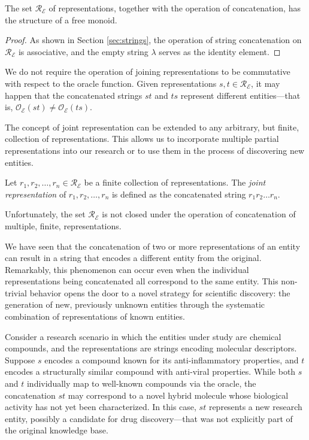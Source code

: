 \begin{proposition}
The set $\mathcal{R}_\mathcal{E}$ of representations, together with the operation of concatenation, has the structure of a free monoid.
\end{proposition}
\begin{proof}
As shown in Section \ref{sec:strings}, the operation of string concatenation on $\mathcal{R}_\mathcal{E}$ is associative, and the empty string $\lambda$ serves as the identity element.
\end{proof}

We do not require the operation of joining representations to be commutative with respect to the oracle function. Given representations $s, t \in \mathcal{R}_\mathcal{E}$, it may happen that the concatenated strings $st$ and $ts$ represent different entities—that is, $\mathcal{O}_\mathcal{E} \left( st \right) \neq \mathcal{O}_\mathcal{E} \left( ts \right)$.

The concept of joint representation can be extended to any arbitrary, but finite, collection of representations. This allows us to incorporate multiple partial representations into our research or to use them in the process of discovering new entities.

\begin{definition}
Let $r_1, r_2, \ldots, r_n \in \mathcal{R}_\mathcal{E}$ be a finite collection of representations. The \emph{joint representation} of $r_1, r_2, \ldots, r_n$ is defined as the concatenated string $r_1 r_2 \ldots r_n$.
\end{definition}

Unfortunately, the set $\mathcal{R}_\mathcal{E}$ is not closed under the operation of concatenation of multiple, finite, representations.

We have seen that the concatenation of two or more representations of an entity can result in a string that encodes a different entity from the original. Remarkably, this phenomenon can occur even when the individual representations being concatenated all correspond to the same entity. This non-trivial behavior opens the door to a novel strategy for scientific discovery: the generation of new, previously unknown entities through the systematic combination of representations of known entities.

\begin{example}
Consider a research scenario in which the entities under study are chemical compounds, and the representations are strings encoding molecular descriptors. Suppose $s$ encodes a compound known for its anti-inflammatory properties, and $t$ encodes a structurally similar compound with anti-viral properties. While both $s$ and $t$ individually map to well-known compounds via the oracle, the concatenation $st$ may correspond to a novel hybrid molecule whose biological activity has not yet been characterized. In this case, $st$ represents a new research entity, possibly a candidate for drug discovery—that was not explicitly part of the original knowledge base.
\end{example}

